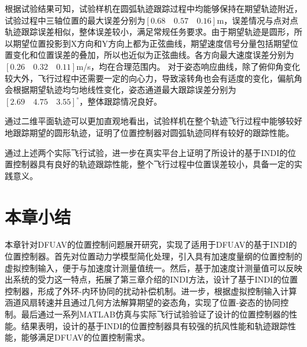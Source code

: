 根据试验结果可知，试验样机在圆弧轨迹跟踪过程中均能够保持在期望轨迹附近，试验过程中三轴位置的最大误差分别为$[0.68\quad0.57\quad0.16]$m，误差情况与点对点轨迹跟踪误差相似，整体误差较小，满足常规任务要求。由于期望轨迹是圆形，所以期望位置投影到X方向和Y方向上都为正弦曲线，期望速度信号分量包括期望位置变化和位置误差的叠加，所以也近似为正弦曲线。各方向最大速度误差分别为$[0.26\quad0.32\quad0.11]$m/s，均在合理范围内。
对于姿态响应曲线，除了俯仰角变化较大外，飞行过程中还需要一定的向心力，导致滚转角也会有适度的变化，偏航角会根据期望轨迹均匀地线性变化，姿态通道最大跟踪误差分别为$[2.69\quad4.75\quad3.55]^\circ$，整体跟踪情况良好。

通过二维平面轨迹可以更加直观地看出，试验样机在整个轨迹飞行过程中能够较好地跟踪期望的圆形轨迹，证明了位置控制器对圆弧轨迹同样有较好的跟踪性能。

通过上述两个实际飞行试验，进一步在真实平台上证明了所设计的基于INDI的位置控制器具有良好的轨迹跟踪性能，整个飞行过程中位置误差较小，具备一定的实践意义。

\section{本章小结}

本章针对DFUAV的位置控制问题展开研究，实现了适用于DFUAV的基于INDI的位置控制器。首先对位置动力学模型简化处理，引入具有加速度量纲的位置控制的虚拟控制输入，便于与加速度计测量值统一。然后，基于加速度计测量值可以反映出系统的受力这一特点，拓展了第三章介绍的INDI方法，设计了基于INDI的位置控制器，形成了外环-内环协同的扰动补偿机制。进一步，根据虚拟控制输入计算涵道风扇转速并且通过几何方法解算期望的姿态角，实现了位置-姿态的协同控制。最后通过一系列MATLAB仿真与实际飞行试验验证了设计的位置控制器的性能。结果表明，设计的基于INDI的位置控制器具有较强的抗风性能和轨迹跟踪性能，能够满足DFUAV的位置控制需求。








